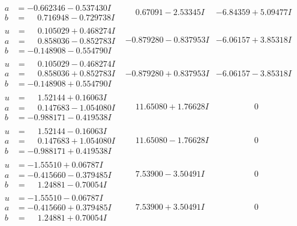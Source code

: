 \documentclass[1p]{elsarticle_modified}
\theoremstyle{definition}
\begin{document}
$$\begin{array}{c|c|c}
\begin{aligned}
a &= -0.662346 - 0.537430 I \\
b &= \phantom{-}0.716948 - 0.729738 I\end{aligned}
 & \phantom{-}0.67091 - 2.53345 I & -6.84359 + 5.09477 I \\ \hline\begin{aligned}
u &= \phantom{-}0.105029 + 0.468274 I \\
a &= \phantom{-}0.858036 - 0.852783 I \\
b &= -0.148908 - 0.554790 I\end{aligned}
 & -0.879280 - 0.837953 I & -6.06157 + 3.85318 I \\ \hline\begin{aligned}
u &= \phantom{-}0.105029 - 0.468274 I \\
a &= \phantom{-}0.858036 + 0.852783 I \\
b &= -0.148908 + 0.554790 I\end{aligned}
 & -0.879280 + 0.837953 I & -6.06157 - 3.85318 I \\ \hline\begin{aligned}
u &= \phantom{-}1.52144 + 0.16063 I \\
a &= \phantom{-}0.147683 - 1.054080 I \\
b &= -0.988171 - 0.419538 I\end{aligned}
 & \phantom{-}11.65080 + 1.76628 I & \phantom{-0.000000 } 0 \\ \hline\begin{aligned}
u &= \phantom{-}1.52144 - 0.16063 I \\
a &= \phantom{-}0.147683 + 1.054080 I \\
b &= -0.988171 + 0.419538 I\end{aligned}
 & \phantom{-}11.65080 - 1.76628 I & \phantom{-0.000000 } 0 \\ \hline\begin{aligned}
u &= -1.55510 + 0.06787 I \\
a &= -0.415660 - 0.379485 I \\
b &= \phantom{-}1.24881 - 0.70054 I\end{aligned}
 & \phantom{-}7.53900 - 3.50491 I & \phantom{-0.000000 } 0 \\ \hline\begin{aligned}
u &= -1.55510 - 0.06787 I \\
a &= -0.415660 + 0.379485 I \\
b &= \phantom{-}1.24881 + 0.70054 I\end{aligned}
 & \phantom{-}7.53900 + 3.50491 I & \phantom{-0.000000 } 0\\

\end{array}$$
\end{document}

